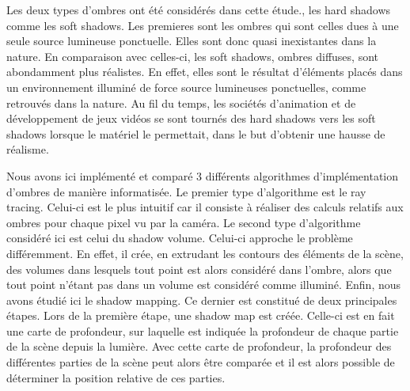 \documentclass[a4paper,10pt]{report}
\begin{document}
Les deux types d'ombres ont été considérés dans cette étude., les hard shadows comme les soft shadows. Les premieres sont les ombres qui sont celles dues à une seule source lumineuse ponctuelle. Elles sont donc quasi inexistantes dans la nature. En comparaison avec celles-ci, les soft shadows, ombres diffuses, sont abondamment plus réalistes. En effet, elles sont le résultat d'éléments placés dans un environnement illuminé de force source lumineuses ponctuelles, comme retrouvés dans la nature.
Au fil du temps, les sociétés d'animation et de développement de jeux vidéos se sont tournés des hard shadows vers les soft shadows lorsque le matériel le permettait, dans le but d'obtenir une hausse de réalisme.

Nous avons ici implémenté et comparé 3 différents algorithmes d'implémentation d'ombres de manière informatisée. Le premier type d'algorithme est le ray tracing. Celui-ci est le plus intuitif car il consiste à réaliser des calculs relatifs aux ombres pour chaque pixel vu par la caméra. Le second type d'algorithme considéré ici est celui du shadow volume. Celui-ci approche le problème différemment. En effet, il crée, en extrudant les contours des éléments de la scène, des volumes dans lesquels tout point est alors considéré dans l'ombre, alors que tout point n'étant pas dans un volume est considéré comme illuminé. Enfin, nous avons étudié ici le shadow mapping. Ce dernier est constitué de deux principales étapes. Lors de la première étape, une shadow map est créée. Celle-ci est en fait une carte de profondeur, sur laquelle est indiquée la profondeur de chaque partie de la scène depuis la lumière. Avec cette carte de profondeur, la profondeur des différentes parties de la scène peut alors être comparée et il est alors possible de déterminer la position relative de ces parties.






\end{document}
